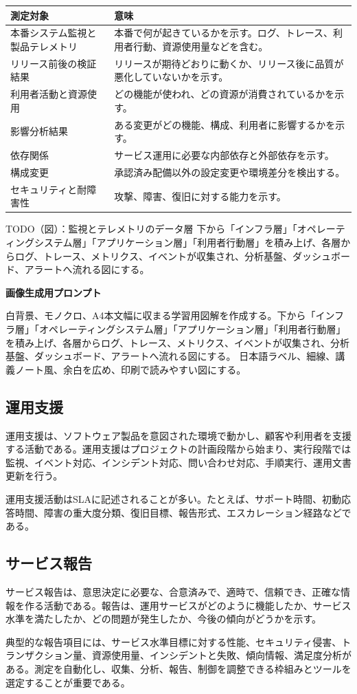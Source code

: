 \documentclass[uplatex,dvipdfmx,a4paper,10pt]{jsarticle}
\newcommand{\todoprompt}[2]{%
\begin{notebox}{TODO（図）：#1}
#2

\textbf{画像生成用プロンプト}

白背景、モノクロ、A4本文幅に収まる学習用図解を作成する。#2 日本語ラベル、細線、講義ノート風、余白を広め、印刷で読みやすい図にする。
\end{notebox}
}
\begin{document}
\begin{longtable}{L{55mm}L{95mm}}
\toprule
測定対象 & 意味 \\
\midrule
本番システム監視と製品テレメトリ & 本番で何が起きているかを示す。ログ、トレース、利用者行動、資源使用量などを含む。 \\
リリース前後の検証結果 & リリースが期待どおりに動くか、リリース後に品質が悪化していないかを示す。 \\
利用者活動と資源使用 & どの機能が使われ、どの資源が消費されているかを示す。 \\
影響分析結果 & ある変更がどの機能、構成、利用者に影響するかを示す。 \\
依存関係 & サービス運用に必要な内部依存と外部依存を示す。 \\
構成変更 & 承認済み配備以外の設定変更や環境差分を検出する。 \\
セキュリティと耐障害性 & 攻撃、障害、復旧に対する能力を示す。 \\
\bottomrule
\end{longtable}

\todoprompt{監視とテレメトリのデータ層}{下から「インフラ層」「オペレーティングシステム層」「アプリケーション層」「利用者行動層」を積み上げ、各層からログ、トレース、メトリクス、イベントが収集され、分析基盤、ダッシュボード、アラートへ流れる図にする。}

\subsection{運用支援}

運用支援は、ソフトウェア製品を意図された環境で動かし、顧客や利用者を支援する活動である。運用支援はプロジェクトの計画段階から始まり、実行段階では監視、イベント対応、インシデント対応、問い合わせ対応、手順実行、運用文書更新を行う。

運用支援活動はSLAに記述されることが多い。たとえば、サポート時間、初動応答時間、障害の重大度分類、復旧目標、報告形式、エスカレーション経路などである。

\subsection{サービス報告}

サービス報告は、意思決定に必要な、合意済みで、適時で、信頼でき、正確な情報を作る活動である。報告は、運用サービスがどのように機能したか、サービス水準を満たしたか、どの問題が発生したか、今後の傾向がどうかを示す。

典型的な報告項目には、サービス水準目標に対する性能、セキュリティ侵害、トランザクション量、資源使用量、インシデントと失敗、傾向情報、満足度分析がある。測定を自動化し、収集、分析、報告、制御を調整できる枠組みとツールを選定することが重要である。
\end{document}
